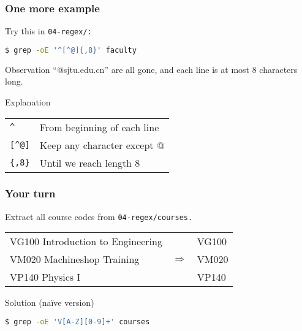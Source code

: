 \begin{frame}[fragile]
    \frametitle{One more example}
    Try this in \tt{04-regex/}:
    \begin{lstlisting}[language=bash]
$ grep -oE '^[^@]{,8}' faculty
\end{lstlisting}
    \pause
    \begin{block}{Observation}
        ``@sjtu.edu.cn'' are all gone, and each line is at most 8 characters long.
    \end{block}
    \begin{block}{Explanation}
        \begin{tabular}{ll}
            \verb|^|    & From beginning of each line \\
            \verb|[^@]| & Keep any character except @ \\
            \verb|{,8}| & Until we reach length 8
        \end{tabular}
    \end{block}
\end{frame}

\begin{frame}[fragile]
    \frametitle{Your turn}
    Extract all course codes from \tt{04-regex/courses}. \newline

    \begin{example}
        \begin{tabular}{lcl}
            VG100 Introduction to Engineering &                   & VG100 \\
            VM020 Machineshop Training        & $\Longrightarrow$ & VM020 \\
            VP140 Physics I                   &                   & VP140
        \end{tabular}
    \end{example}
    \pause
    \begin{block}{Solution (naïve version)}
        \begin{lstlisting}[language=bash]
$ grep -oE 'V[A-Z][0-9]+' courses
\end{lstlisting}
    \end{block}
\end{frame}

